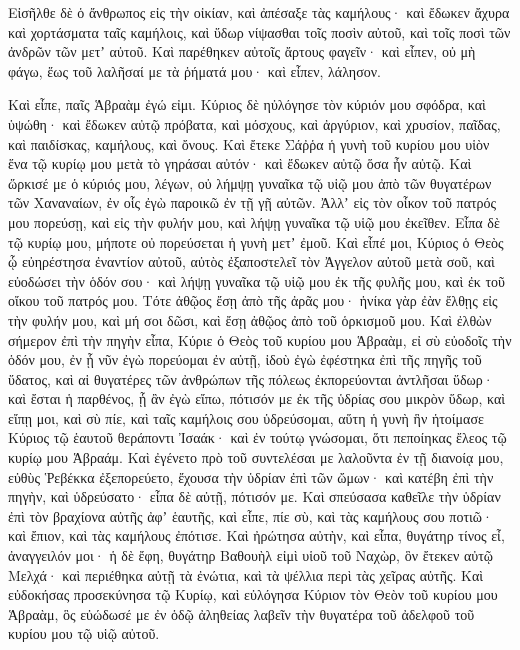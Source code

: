 {Εἰσῆλθε δὲ ὁ ἄνθρωπος εἰς τὴν οἰκίαν, καὶ ἀπέσαξε τὰς καμήλους· καὶ ἔδωκεν ἄχυρα καὶ χορτάσματα ταῖς καμήλοις, καὶ ὕδωρ νίψασθαι τοῖς ποσὶν αὐτοῦ, καὶ τοῖς ποσὶ τῶν ἀνδρῶν τῶν μετʼ αὐτοῦ.
Καὶ παρέθηκεν αὐτοῖς ἄρτους φαγεῖν· καὶ εἶπεν, οὐ μὴ φάγω, ἕως τοῦ λαλῆσαί με τὰ ῥήματά μου· καὶ εἶπεν, λάλησον.
\par }{\PP {}Καὶ εἶπε, παῖς Ἁβραὰμ ἐγώ εἰμι.
Κύριος δὲ ηὐλόγησε τὸν κύριόν μου σφόδρα, καὶ ὑψώθη· καὶ ἔδωκεν αὐτῷ πρόβατα, καὶ μόσχους, καὶ ἀργύριον, καὶ χρυσίον, παῖδας, καὶ παιδίσκας, καμήλους, καὶ ὄνους.
Καὶ ἔτεκε Σάῤῥα ἡ γυνὴ τοῦ κυρίου μου υἱὸν ἕνα τῷ κυρίῳ μου μετὰ τὸ γηράσαι αὐτόν· καὶ ἔδωκεν αὐτῷ ὅσα ἦν αὐτῷ.
Καὶ ὥρκισέ με ὁ κύριός μου, λέγων, οὐ λήμψῃ γυναῖκα τῷ υἱῷ μου ἀπὸ τῶν θυγατέρων τῶν Χαναναίων, ἐν οἷς ἐγὼ παροικῶ ἐν τῇ γῇ αὐτῶν.
Ἀλλʼ εἰς τὸν οἶκον τοῦ πατρός μου πορεύσῃ, καὶ εἰς τὴν φυλήν μου, καὶ λήψῃ γυναῖκα τῷ υἱῷ μου ἐκεῖθεν.
Εἶπα δὲ τῷ κυρίῳ μου, μήποτε οὐ πορεύσεται ἡ γυνὴ μετʼ ἐμοῦ.
Καὶ εἶπέ μοι, Κύριος ὁ Θεὸς ᾧ εὐηρέστησα ἐναντίον αὐτοῦ, αὐτὸς ἐξαποστελεῖ τὸν Ἀγγελον αὐτοῦ μετὰ σοῦ, καὶ εὐοδώσει τὴν ὁδόν σου· καὶ λήψῃ γυναῖκα τῷ υἱῷ μου ἐκ τῆς φυλῆς μου, καὶ ἐκ τοῦ οἴκου τοῦ πατρός μου.
Τότε ἀθῷος ἔσῃ ἀπὸ τῆς ἀρᾶς μου· ἡνίκα γὰρ ἐὰν ἔλθῃς εἰς τὴν φυλήν μου, καὶ μή σοι δῶσι, καὶ ἔσῃ ἀθῷος ἀπὸ τοῦ ὁρκισμοῦ μου.
Καὶ ἐλθὼν σήμερον ἐπὶ τὴν πηγὴν εἶπα, Κύριε ὁ Θεὸς τοῦ κυρίου μου Ἁβραὰμ, εἰ σὺ εὐοδοῖς τὴν ὁδόν μου, ἐν ᾗ νῦν ἐγὼ πορεύομαι ἐν αὐτῇ,
ἰδοὺ ἐγὼ ἐφέστηκα ἐπὶ τῆς πηγῆς τοῦ ὕδατος, καὶ αἱ θυγατέρες τῶν ἀνθρώπων τῆς πόλεως ἐκπορεύονται ἀντλῆσαι ὕδωρ· καὶ ἔσται ἡ παρθένος, ᾗ ἂν ἐγὼ εἴπω, πότισόν με ἐκ τῆς ὑδρίας σου μικρὸν ὕδωρ,
καὶ εἴπῃ μοι, καὶ σὺ πίε, καὶ ταῖς καμήλοις σου ὑδρεύσομαι, αὕτη ἡ γυνὴ ἣν ἡτοίμασε Κύριος τῷ ἑαυτοῦ θεράποντι Ἰσαάκ· καὶ ἐν τούτῳ γνώσομαι, ὅτι πεποίηκας ἔλεος τῷ κυρίῳ μου Ἁβραάμ.
Καὶ ἐγένετο πρὸ τοῦ συντελέσαι με λαλοῦντα ἐν τῇ διανοίᾳ μου, εὐθὺς Ῥεβέκκα ἐξεπορεύετο, ἔχουσα τὴν ὑδρίαν ἐπὶ τῶν ὤμων· καὶ κατέβη ἐπὶ τὴν πηγὴν, καὶ ὑδρεύσατο· εἶπα δὲ αὐτῇ, πότισόν με.
Καὶ σπεύσασα καθεῖλε τὴν ὑδρίαν ἐπὶ τὸν βραχίονα αὐτῆς ἀφʼ ἑαυτῆς, καὶ εἶπε, πίε σὺ, καὶ τὰς καμήλους σου ποτιῶ· καὶ ἔπιον, καὶ τὰς καμήλους ἐπότισε.
Καὶ ἠρώτησα αὐτὴν, καὶ εἶπα, θυγάτηρ τίνος εἶ, ἀναγγειλόν μοι· ἡ δὲ ἔφη, θυγάτηρ Βαθουὴλ εἰμὶ υἱοῦ τοῦ Ναχὼρ, ὃν ἔτεκεν αὐτῷ Μελχά· καὶ περιέθηκα αὐτῇ τὰ ἐνώτια, καὶ τὰ ψέλλια περὶ τὰς χεῖρας αὐτῆς.
Καὶ εὐδοκήσας προσεκύνησα τῷ Κυρίῳ, καὶ εὐλόγησα Κύριον τὸν Θεὸν τοῦ κυρίου μου Ἁβραὰμ, ὃς εὐώδωσέ με ἐν ὁδῷ ἀληθείας λαβεῖν τὴν θυγατέρα τοῦ ἀδελφοῦ τοῦ κυρίου μου τῷ υἱῷ αὐτοῦ.
}
